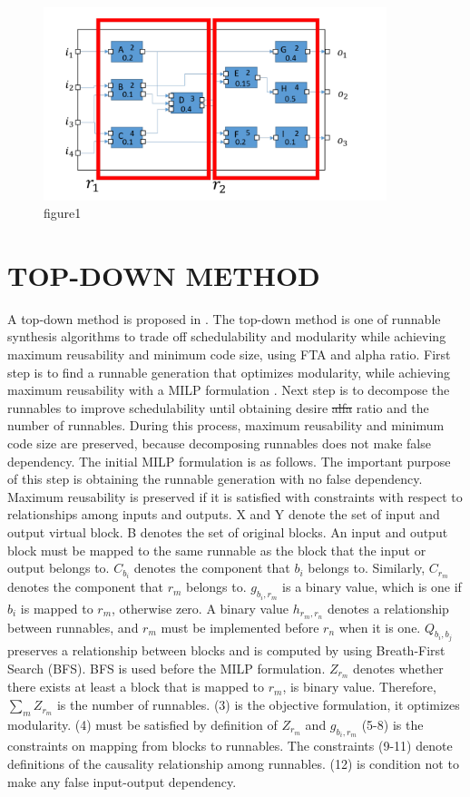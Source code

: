 \documentclass[conference,compsoc]{IEEEtran}
\providecommand{\DIFadd}[1]{{\protect\color{blue}\uwave{#1}}} %
\providecommand{\DIFdel}[1]{{\protect\color{red}\sout{#1}}}                      %
\providecommand{\DIFaddbegin}{} %
\providecommand{\DIFaddend}{} %
\providecommand{\DIFdelbegin}{} %
\providecommand{\DIFdelend}{} %
\begin{document}
\begin{figure}
	\centering
	\includegraphics[width=10cm,clip]{figure2.pdf}
	\caption{figure1}
	\label{fig9}
\end{figure}


\section{TOP-DOWN METHOD}
 A top-down method is proposed in \cite{Deng:2015:MSF:2735960.2735972}.
The top-down method is one of runnable synthesis algorithms to trade off schedulability and modularity while achieving maximum reusability and minimum code size, using FTA and alpha ratio. 
First step is to find a runnable generation that optimizes modularity, while achieving maximum reusability with a MILP formulation \cite{6871195}.
Next step is to decompose the runnables to improve schedulability until obtaining desire \DIFdelbegin \DIFdel{alfa }\DIFdelend \DIFaddbegin \DIFadd{Alfa }\DIFaddend ratio and the number of runnables.
During this process, maximum reusability and minimum code size are preserved, because decomposing runnables does not make false dependency.
 The initial MILP formulation is as follows.
The important purpose of this step is obtaining the runnable generation with no false dependency.
Maximum reusability is preserved if it is satisfied with constraints with respect to relationships among inputs and outputs.
X and Y denote the set of input and output virtual block.
B denotes the set of original blocks.
An input and output block must be mapped to the same runnable as the block that the input or output belongs to.
$C_{b_i}$ denotes the component that $b_i$ belongs to.
Similarly, $C_{r_m}$ denotes the component that $r_m$ belongs to.
$g_{b_i,r_m}$ is a binary value, which is one if $b_i$ is mapped to $r_m$, otherwise zero.
A binary value $h_{r_m,r_n}$ denotes a relationship between runnables, and $r_m$ must be implemented before $r_n$ when it is one.
$Q_{b_i,b_j}$ preserves a relationship between blocks and is computed by using Breath-First Search (BFS).
BFS is used before the MILP formulation.
$Z_{r_m}$ denotes whether there exists at least a block that is mapped to $r_m$, is binary value.
Therefore, $\sum_m Z_{r_m}$ is the number of runnables.
(3) is the objective formulation, it optimizes modularity.
(4) must be satisfied by definition of $Z_{r_m}$ and $g_{b_i,r_m}$
(5-8) is the constraints on mapping from blocks to runnables.
The constraints (9-11) denote definitions of the causality relationship among runnables.
(12) is condition not to make any false input-output dependency. 
\end{document}
